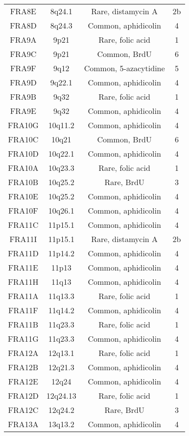 \begin{center}
\begin{longtable}{cccc}
FRA8E  & 8q24.1   & Rare, distamycin A    & 2b \\
FRA8D  & 8q24.3   & Common, aphidicolin   & 4 \\
FRA9A  & 9p21     & Rare, folic acid      & 1 \\
FRA9C  & 9p21     & Common, BrdU          & 6 \\
FRA9F  & 9q12     & Common, 5-azacytidine & 5 \\
FRA9D  & 9q22.1   & Common, aphidicolin   & 4 \\
FRA9B  & 9q32     & Rare, folic acid      & 1 \\
FRA9E  & 9q32     & Common, aphidicolin   & 4 \\
FRA10G & 10q11.2  & Common, aphidicolin   & 4 \\
FRA10C & 10q21    & Common, BrdU          & 6 \\
FRA10D & 10q22.1  & Common, aphidicolin   & 4 \\
FRA10A & 10q23.3  & Rare, folic acid      & 1 \\
FRA10B & 10q25.2  & Rare, BrdU            & 3 \\
FRA10E & 10q25.2  & Common, aphidicolin   & 4 \\
FRA10F & 10q26.1  & Common, aphidicolin   & 4 \\
FRA11C & 11p15.1  & Common, aphidicolin   & 4 \\
FRA11I & 11p15.1  & Rare, distamycin A    & 2b \\
FRA11D & 11p14.2  & Common, aphidicolin   & 4 \\
FRA11E & 11p13    & Common, aphidicolin   & 4 \\
FRA11H & 11q13    & Common, aphidicolin   & 4 \\
FRA11A & 11q13.3  & Rare, folic acid      & 1 \\
FRA11F & 11q14.2  & Common, aphidicolin   & 4 \\
FRA11B & 11q23.3  & Rare, folic acid      & 1 \\
FRA11G & 11q23.3  & Common, aphidicolin   & 4 \\
FRA12A & 12q13.1  & Rare, folic acid      & 1 \\
FRA12B & 12q21.3  & Common, aphidicolin   & 4 \\
FRA12E & 12q24    & Common, aphidicolin   & 4 \\
FRA12D & 12q24.13 & Rare, folic acid      & 1 \\
FRA12C & 12q24.2  & Rare, BrdU            & 3 \\
FRA13A & 13q13.2  & Common, aphidicolin   & 4 \\

\end{longtable}
\end{center}
